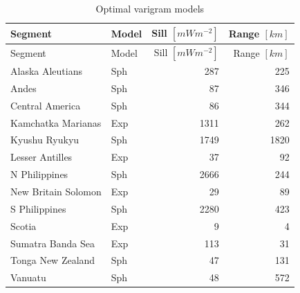 \documentclass[draft,linenumbers]{agujournal2018}
\begin{document}
\hypertarget{tbl:variogram.summary.table}{}
\begin{longtable}[]{@{}llrr@{}}
\caption{\label{tbl:variogram.summary.table}Optimal varigram
models}\tabularnewline
\toprule
Segment & Model & Sill \([mWm^{-2}]\) & Range \([km]\) \\
\midrule
\endfirsthead
\toprule
Segment & Model & Sill \([mWm^{-2}]\) & Range \([km]\) \\
\midrule
\endhead
Alaska Aleutians & Sph & 287 & 225 \\
Andes & Sph & 87 & 346 \\
Central America & Sph & 86 & 344 \\
Kamchatka Marianas & Exp & 1311 & 262 \\
Kyushu Ryukyu & Sph & 1749 & 1820 \\
Lesser Antilles & Exp & 37 & 92 \\
N Philippines & Sph & 2666 & 244 \\
New Britain Solomon & Exp & 29 & 89 \\
S Philippines & Sph & 2280 & 423 \\
Scotia & Exp & 9 & 4 \\
Sumatra Banda Sea & Exp & 113 & 31 \\
Tonga New Zealand & Sph & 47 & 131 \\
Vanuatu & Sph & 48 & 572 \\
\bottomrule
\end{longtable}
\end{document}
